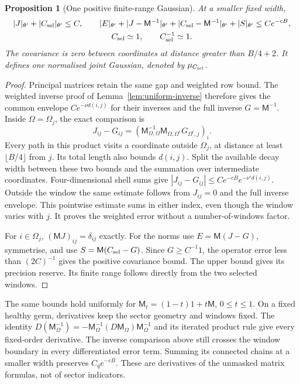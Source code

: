\documentclass[11pt,reqno]{amsart}
\numberwithin{equation}{section}
\newtheorem{proposition}[theorem]{Proposition}
\theoremstyle{definition}
\theoremstyle{remark}
\begin{document}
\begin{proposition}[One positive finite-range Gaussian]
\label{prop:physical-selected-law}
At a smaller fixed width,
\begin{gather}
 |J|_{\theta'}+|C_{\rm sel}|_{\theta'}\le C,\qquad
 |E|_{\theta'}+|J-\mathsf M^{-1}|_{\theta'}
     +|C_{\rm sel}-\mathsf M^{-1}|_{\theta'}+|S|_{\theta'}
                                                 \le Ce^{-cB},
 \label{eq:physical-selected-small-errors}\\
 C_{\rm sel}\simeq1,\qquad C_{\rm sel}^{-1}\simeq1.
 \label{eq:physical-selected-precision-reserve}
\end{gather}
The covariance is zero between coordinates at distance
greater than \(B/4+2\). It defines one normalised joint
Gaussian, denoted by \(\mu_{C_{\rm sel}}\).
\end{proposition}
\begin{proof}
Principal matrices retain the same gap and weighted row bound.
The weighted inverse proof of Lemma~\ref{lem:uniform-inverse}
therefore gives the common envelope \(Ce^{-\nu d(i,j)}\)
for their inverses and the full inverse \(G=\mathsf M^{-1}\).
Inside \(\Omega=\Omega_j\), the exact comparison is
\[
 J_{ij}-G_{ij}=
       (\mathsf M_{\Omega,\Omega}^{-1}
                         \mathsf M_{\Omega,\Omega^c}G_{\Omega^c,j})_i.
\]
Every path in this product visits a coordinate outside
\(\Omega_j\), at distance at least \(\lfloor B/4\rfloor\)
from \(j\). Its total length also bounds \(d(i,j)\).
Split the available decay width between these two bounds and
the summation over intermediate coordinates. Four-dimensional
shell sums give
\(|J_{ij}-G_{ij}|\le Ce^{-cB}e^{-\nu' d(i,j)}\).
Outside the window the same estimate follows from \(J_{ij}=0\)
and the full inverse envelope. This pointwise estimate sums in
either index, even though the window varies with \(j\).
It proves the weighted error without a number-of-windows factor.

For \(i\in\Omega_j\), \((\mathsf MJ)_{ij}=\delta_{ij}\)
exactly. For the norms use
\(E=\mathsf M(J-G)\), symmetrise, and use
\(S=\mathsf M(C_{\rm sel}-G)\).
Since \(G\ge C^{-1}1\), the operator error less than
\((2C)^{-1}\) gives the positive covariance bound.
The upper bound gives its precision reserve. Its finite range
follows directly from the two selected windows.
\end{proof}

The same bounds hold uniformly for
\(\mathsf M_t=(1-t)1+t\mathsf M\), \(0\le t\le1\).
On a fixed healthy germ, derivatives keep the sector geometry
and windows fixed. The identity
\(D(\mathsf M_\Omega^{-1})=-\mathsf M_\Omega^{-1}
(D\mathsf M_\Omega)\mathsf M_\Omega^{-1}\)
and its iterated product rule give every fixed-order derivative.
The inverse comparison above still crosses the window boundary
in every differentiated error term. Summing its connected chains
at a smaller width preserves \(C_qe^{-cB}\).
These are derivatives of the unmasked matrix formulas, not of
sector indicators.
\end{document}
